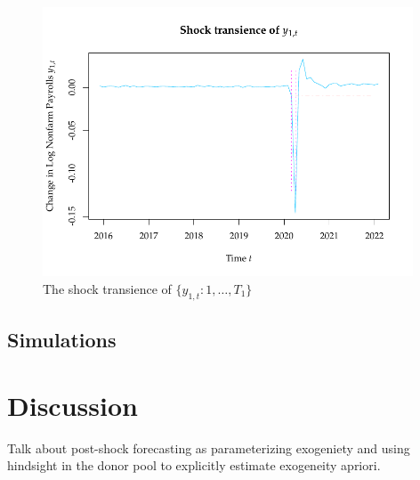 \documentclass[11pt]{article}
\theoremstyle{definition}
\begin{document}
\begin{figure}[H]
	\begin{center}
		\includegraphics[height = 8cm]{UEMtransience.pdf}
		\caption{The shock transience of $\{y_{1,t} \colon 1, \ldots, T_1\}$} \label{uemshocktransience}
	\end{center}	
\end{figure}



\subsection{Simulations}
\label{simulation}



\section{Discussion}

Talk about post-shock forecasting as parameterizing exogeniety and using hindsight in the donor pool to explicitly estimate exogeneity apriori.






%

	
\end{document}
